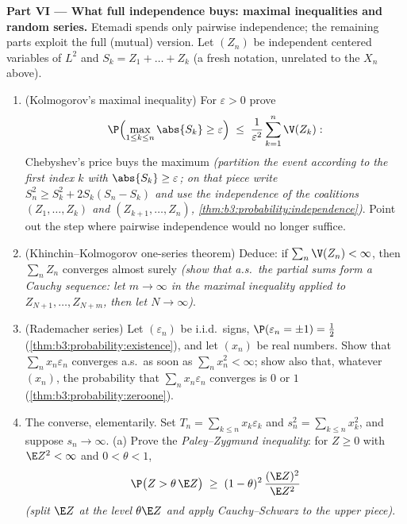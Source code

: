 \begin{problem}
\medskip
\noindent\textbf{Part VI --- What full independence buys:
maximal inequalities and random series.} Etemadi spends
only pairwise independence; the remaining parts exploit the
full (mutual) version. Let $(Z_n)$ be independent centered
variables of $L^2$ and $S_k = Z_1 + \dots + Z_k$ (a fresh
notation, unrelated to the $X_n$ above).
\begin{enumerate}[resume]
  \item (Kolmogorov's maximal inequality) For $\varepsilon
        > 0$ prove
        \[
        \P\Bigl(\max_{1\leq k\leq n}\abs{S_k} \geq
        \varepsilon\Bigr) \;\leq\;
        \frac1{\varepsilon^2}\sum_{k=1}^n\V(Z_k) :
        \]
        Chebyshev's price buys the maximum \emph{(partition
        the event according to the first index $k$ with
        $\abs{S_k} \geq \varepsilon$; on that piece write
        $S_n^2 \geq S_k^2 + 2S_k(S_n - S_k)$ and use the
        independence of the coalitions $(Z_1, \dots, Z_k)$
        and $(Z_{k+1}, \dots, Z_n)$,
        \cref{thm:b3:probability:independence})}. Point out
        the step where pairwise independence would no
        longer suffice.
  \item (Khinchin--Kolmogorov one-series theorem) Deduce:
        if $\sum_n\V(Z_n) < \infty$, then $\sum_nZ_n$
        converges almost surely \emph{(show that a.s.\ the
        partial sums form a Cauchy sequence: let $m \to
        \infty$ in the maximal inequality applied to
        $Z_{N+1}, \dots, Z_{N+m}$, then let $N \to
        \infty$)}.
  \item (Rademacher series) Let $(\varepsilon_n)$ be
        i.i.d.\ signs, $\P(\varepsilon_n = \pm1) =
        \frac12$ (\cref{thm:b3:probability:existence}), and
        let $(x_n)$ be real numbers. Show that
        $\sum_nx_n\varepsilon_n$ converges a.s.\ as soon as
        $\sum_nx_n^2 < \infty$; show also that, whatever
        $(x_n)$, the probability that
        $\sum_nx_n\varepsilon_n$ converges is $0$ or $1$
        (\cref{thm:b3:probability:zeroone}).
  \item The converse, elementarily. Set $T_n = \sum_{k\leq
        n}x_k\varepsilon_k$ and $s_n^2 = \sum_{k\leq
        n}x_k^2$, and suppose $s_n \to \infty$.
        (a) Prove the \emph{Paley--Zygmund inequality}: for
        $Z \geq 0$ with $\E Z^2 < \infty$ and $0 < \theta <
        1$,
        \[
        \P\bigl(Z > \theta\,\E Z\bigr) \;\geq\; (1 -
        \theta)^2\,\frac{(\E Z)^2}{\E Z^2}
        \]
        \emph{(split $\E Z$ at the level $\theta\E Z$ and
        apply Cauchy--Schwarz to the upper piece)}.

\end{enumerate}
\end{problem}
